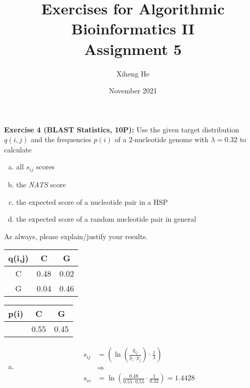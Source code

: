 \documentclass{article}
\title{Exercises for Algorithmic Bioinformatics II\\
Assignment 5}
\author{Xiheng He}
\date{November 2021}
\begin{document}
{\let\newpage\relax\maketitle}
\begin{flushleft}
\textbf{Exercise 4 (BLAST Statistics, 10P):}
\newline
Use the given target distribution $q(i,j)$ and the frequencies $p(i)$ of a 2-nucleotide genome with
$\lambda = 0.32$ to calculate
\begin{enumerate}[(a)]
    \item all $s_{ij}$ scores
    \item the \textit{NATS} score
    \item the expected score of a nucleotide pair in a HSP
    \item the expected score of a random nucleotide pair in general
\end{enumerate}
As always, please explain/justify your results.
\newline \\
\begin{table}[H]
\begin{minipage}[b]{0.48\linewidth}
    \centering
    \begin{tabular}[]{c|c|c}
        q(i,j) & C & G \\
        \hline
        C & 0.48 & 0.02 \\
        \hline
        G & 0.04 & 0.46
    \end{tabular}
\end{minipage}
\begin{minipage}[b]{0.48\linewidth}
    \centering
    \begin{tabular}[]{c|c|c}
        p(i) & C & G \\
        \hline
        & 0.55 & 0.45
    \end{tabular}
\end{minipage}
\end{table}
\begin{enumerate}[(a)]
    \item 
    \begin{align*}
        s_{ij} &= (\ln(\frac{q_{ij}}{p_i \cdot p_j}) \cdot \frac{1}{\lambda}) \\
        & \Longrightarrow \\
        s_{cc} &= \ln(\frac{0.48}{0.55 \cdot 0.55} \cdot \frac{1}{0.32}) = 1.4428 \\

\end{align*}
\end{enumerate}
\end{flushleft}
\end{document}
